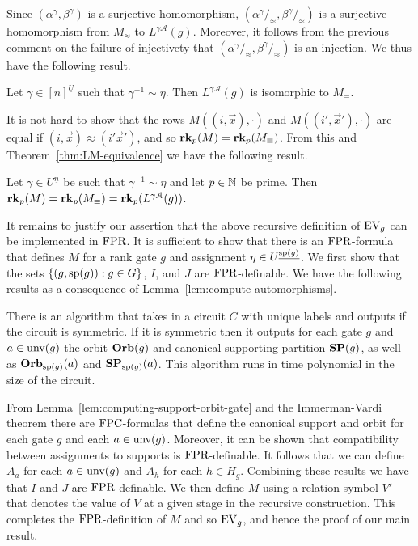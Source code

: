 \documentclass[a4paper,UKenglish]{lipics-v2018}
\begin{document}
Since $(\alpha^{\gamma}, \beta^{\gamma})$ is a surjective homomorphism,
$(\alpha^{\gamma} /_\approx, \beta^{\gamma} /_\approx)$ is a surjective
homomorphism from $M_\approx$ to $L^{\gamma \mathcal{A}}(g)$. Moreover, it
follows from the previous comment on the failure of injectivety that
$(\alpha^{\gamma} /_\approx, \beta^{\gamma} /_\approx)$ is an injection. We thus
have the following result.

\begin{theorem}
	Let $\gamma \in [n]^{\underline{U}}$ such that $\gamma^{-1} \sim \eta$. Then
  $L^{\gamma \mathcal{A}}(g)$ is isomorphic to $M_{\equiv}$.
	\label{thm:LM-equivalence}
\end{theorem}

It is not hard to show that the rows $M ((i, \vec{x}), \cdot)$ and $M((i',
\vec{x}'), \cdot)$ are equal if $(i, \vec{x}) \approx (i' \vec{x}')$, and so
$\text{\textbf{rk}}_p (M) = \text{\textbf{rk}}_p(M_\equiv)$. From this and
Theorem~\ref{thm:LM-equivalence} we have the following result.

\begin{lemma}
	Let $\gamma \in U^{\underline{n}}$ be such that $\gamma^{-1} \sim \eta$ and
  let $p \in \mathbb{N}$ be prime. Then $\text{\textbf{rk}}_p (M) = \text{\textbf{rk}}_p (M_\equiv) = \text{\textbf{rk}}_p
  (L^{\gamma \mathcal{A}}(g))$.
  \label{lem:rank-triple-equivilence}
\end{lemma}

It remains to justify our assertion that the above recursive definition of
$\text{EV}_g$ can be implemented in $\text{\upshape FPR}$. It is sufficient to show that there is an
$\text{\upshape FPR}$-formula that defines $M$ for a rank gate $g$ and assignment $\eta \in
U^{\underline{\text{sp}(g)}}$. We first show that the sets $\{(g, \text{sp}(g)) : g
\in G\}$, $I$, and $J$ are $\text{\upshape FPR}$-definable. We have the following results as a
consequence of Lemma~\ref{lem:compute-automorphisms}.

\begin{lemma}
  There is an algorithm that takes in a circuit $C$ with unique labels and
  outputs if the circuit is symmetric. If it is symmetric then it outputs for
  each gate $g$ and $a \in \text{unv}(g)$ the orbit $\text{\textbf{Orb}}(g)$ and canonical
  supporting partition $\text{\textbf{SP}}(g)$, as well as $\text{\textbf{Orb}}_{\text{sp}(g)}(a)$ and
  $\text{\textbf{SP}}_{\text{sp}(g)}(a)$. This algorithm runs in time polynomial in the size of
  the circuit.
  \label{lem:computing-support-orbit-gate}
\end{lemma}

From Lemma~\ref{lem:computing-support-orbit-gate} and the Immerman-Vardi theorem
there are $\text{\upshape FPC}$-formulas that define the canonical support and orbit for each
gate $g$ and each $a \in \text{unv}(g)$. Moreover, it can be shown that
compatibility between assignments to supports is $\text{\upshape FPR}$-definable. It follows
that we can define $A_a$ for each $a \in \text{unv}(g)$ and $A_h$ for each $h \in
H_g$. Combining these results we have that $I$ and $J$ are $\text{\upshape FPR}$-definable. We
then define $M$ using a relation symbol $V'$ that denotes the value of $V$ at a
given stage in the recursive construction. This completes the $\text{\upshape FPR}$-definition
of $M$ and so $\text{EV}_g$, and hence the proof of our main result.
\end{document}
